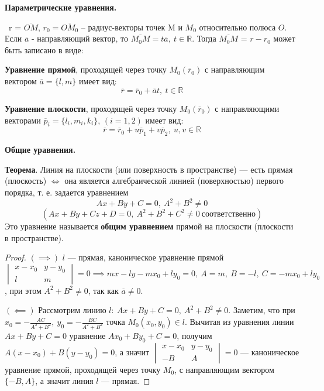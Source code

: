 \bigbreak
\centerline{\textbf{Параметрические уравнения.}}

\mathLet \ r = $\overline{OM}$, $r_0 = \overline{OM_0}$ -- радиус-векторы точек M и $M_0$ относительно полюса $O$. Если $\overline{a}$ - направляющий вектор, то $\overline{M_0M} = t\overline{a},~t\in\mathbb{R}$. Тогда $\overline{M_0M}$ = $r-r_0$ может быть записано в виде:

\textbf{Уравнение прямой}, проходящей через точку $M_0(\overline{r}_0)$ с направляющим вектором $\overline{a}=\{l,m\}$ имеет вид:
$$\overline{r} = \overline{r}_0 + \overline{a}t,~t\in\mathbb{R}$$

\textbf{Уравнение плоскости}, проходящей через точку $M_0(\overline{r}_0)$ с направляющими векторами $\overline{p}_i=\{l_i,m_i,k_i\}$, $(i=1,2)$ имеет вид:
$$\overline{r} = \overline{r}_0 + u\overline{p}_1 + v\overline{p}_2,~u,v\in\mathbb{R}$$

\bigbreak
\centerline{\textbf{Общие уравнения.}}

\textbf{Теорема}. Линия на плоскости (или поверхность в пространстве) --- есть прямая (плоскость) $\iff$ она является алгебраической линией (поверхностью) первого порядка, т. е. задается уравнением $$Ax+By+C=0,~A^2+B^2\neq0$$ $$(Ax+By+Cz+D=0,~A^2+B^2+C^2\neq0~\text{соответственно})$$ 
Это уравнение называется \textbf{общим уравнением} прямой на плоскости (плоскости в пространстве).

\begin{proof} $(\implies)$
$l$ --- прямая, каноническое уравнение прямой $\begin{vmatrix} x-x_0 & y-y_0 \\ l & m \end{vmatrix} = 0 \implies mx -ly -mx_0 +ly_0 = 0,~A=m,~B=-l,~C=-mx_0 +ly_0$, при этом $A^2+B^2\neq0$, так как $\overline{a}\neq 0$.

$(\impliedby)$ Рассмотрим линию $l:~Ax+By+C=0,~A^2+B^2\neq0$. Заметим, что при $x_0=-\frac{AC}{A^2+B^2},~y_0=-\frac{BC}{A^2+B^2}$ точка $M_0(x_0,y_0)\in l$. Вычитая из уравнения линии $Ax+By+C=0$ уравнение $Ax_0+By_0+C=0$, получим $A(x-x_0)+B(y-y_0)=0$, а значит $\begin{vmatrix} x-x_0 & y-y_0 \\ -B & A \end{vmatrix} = 0$ --- каноническое уравнение прямой, проходящей через точку $M_0$, с направляющим вектором $\{-B,A\}$, а значит линия $l$ --- прямая. 
\end{proof}
    


